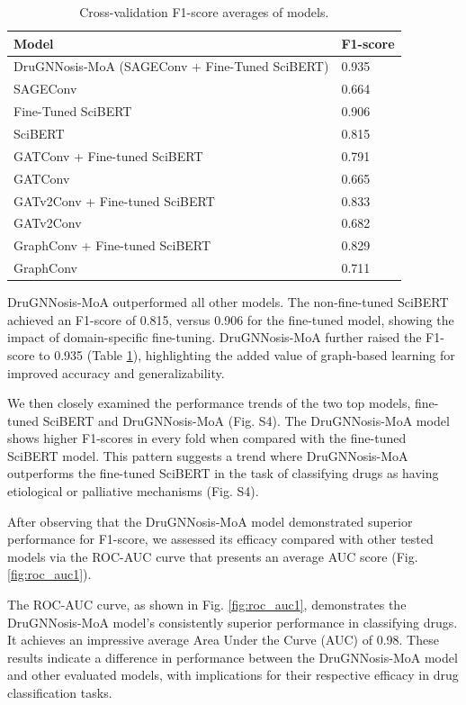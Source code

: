 \documentclass[journal,twoside,web]{ieeecolor}
\begin{document}
\begin{table}
\caption{Cross-validation F1-score averages of models.}
\label{tbl:cv_scores}%
\begin{tabular*}{\columnwidth}{@{\extracolsep\fill}ll@{\extracolsep\fill}}
\toprule
Model & F1-score \\
\midrule
DruGNNosis-MoA (SAGEConv + Fine-Tuned SciBERT) & 0.935 \\
SAGEConv & 0.664 \\
Fine-Tuned SciBERT & 0.906 \\
SciBERT & 0.815 \\
GATConv + Fine-tuned SciBERT & 0.791 \\
GATConv & 0.665 \\
GATv2Conv + Fine-tuned SciBERT & 0.833 \\
GATv2Conv & 0.682 \\
GraphConv + Fine-tuned SciBERT & 0.829 \\
GraphConv & 0.711 \\
\bottomrule
\end{tabular*}
\end{table}



DruGNNosis-MoA outperformed all other models.
The non-fine-tuned SciBERT achieved an F1-score of 0.815, versus 0.906 for the fine-tuned model, showing the impact of domain-specific fine-tuning. 
DruGNNosis-MoA further raised the F1-score to 0.935 (Table \ref{tbl:cv_scores}), highlighting the added value of graph-based learning for improved accuracy and generalizability.

We then closely examined the performance trends of the two top models, fine-tuned SciBERT and DruGNNosis-MoA (Fig. S4). %
The DruGNNosis-MoA model shows higher F1-scores in every fold when compared with the fine-tuned SciBERT model.
This pattern suggests a trend where DruGNNosis-MoA outperforms the fine-tuned SciBERT in the task of classifying drugs as having etiological or palliative mechanisms (Fig. S4). %

After observing that the DruGNNosis-MoA model demonstrated superior performance for F1-score, we assessed its efficacy compared with other tested models via the ROC-AUC curve that presents an average AUC score (Fig. \ref{fig:roc_auc1}).



The ROC-AUC curve, as shown in Fig. \ref{fig:roc_auc1}, 
demonstrates the DruGNNosis-MoA model's consistently superior performance in classifying drugs.
It achieves an impressive average Area Under the Curve (AUC) of 0.98.
These results indicate a difference in performance between the DruGNNosis-MoA model and other evaluated models, with implications for their respective efficacy in drug classification tasks.
\end{document}
